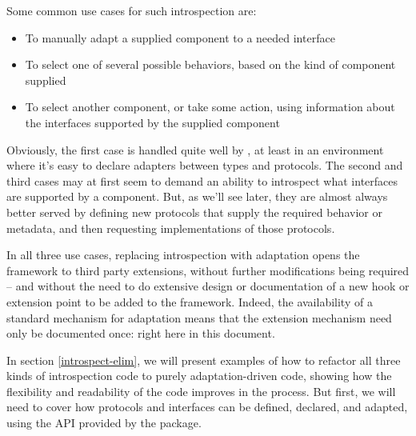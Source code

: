\begin{verbatim%
}
\begin{verbatim%
}
Some common use cases for such introspection are:

\begin{itemize}

\item To manually adapt a supplied component to a needed interface

\item To select one of several possible behaviors, based on the kind of
component supplied

\item To select another component, or take some action, using information
about the interfaces supported by the supplied component

\end{itemize}

Obviously, the first case is handled quite well by , at
least in an environment where it's easy to declare adapters between types and
protocols.  The second and third cases may at first seem to demand an ability
to introspect what interfaces are supported by a component.  But, as we'll
see later, they are almost always better served by defining new protocols
that supply the required behavior or metadata, and then requesting
implementations of those protocols.

In all three use cases, replacing introspection with adaptation opens the
framework to third party extensions, without further modifications being
required -- and without the need to do extensive design or documentation
of a new hook or extension point to be added to the framework.  Indeed,
the availability of a standard mechanism for adaptation means that the
extension mechanism need only be documented once: right here in this
document.

In section \ref{introspect-elim}, we will present examples of how to
refactor all three kinds of introspection code to purely adaptation-driven
code, showing how the flexibility and readability of the code improves in the
process.  But first, we will need to cover how protocols and interfaces can
be defined, declared, and adapted, using the API provided by the
 package.

\begin{seealso}


\end{seealso}























\end{verbatim%
}
\end{verbatim%
}
